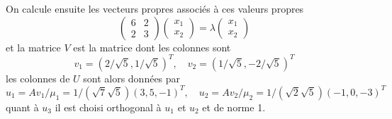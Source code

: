 {\begin{enumerate}
{On calcule ensuite les vecteurs propres associ\'es \`a ces valeurs propres
$$\left(\begin{array}{cc}6&2\\2& 3\end{array}\right)\left(\begin{array}{c}x_1\\x_2\end{array}\right) =\lambda \left(\begin{array}{c}x_1\\x_2\end{array}\right)$$
et la matrice $V$ est la matrice dont les colonnes sont
$$v_1=(2/\sqrt{5}, 1/\sqrt{5})^T,\quad v_2=(1/\sqrt{5}, -2/\sqrt{5})^T$$
les colonnes de $U$ sont alors donn\'ees par
$$u_1=Av_1/\mu_1=1/(\sqrt{7}\sqrt{5})(3,5,-1)^T ,\quad u_2=Av_2/\mu_2=1/(\sqrt{2}\sqrt{5})(-1,0,-3)^T$$
quant \`a $u_3$ il est choisi orthogonal \`a $u_1$ et $u_2$ et de norme 1.
}
\end{enumerate}
}

